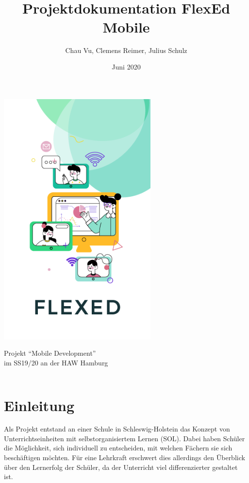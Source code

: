 \documentclass[
  a4paper,
  DIV=10,
  oneside,
  BCOR=5mm,
  parskip=half,
  numbers=noenddot
]{scrreprt}
\title{Projektdokumentation FlexEd Mobile}
\author{Chau Vu, Clemens Reimer, Julius Schulz}
\date{Juni 2020}
\begin{document}

\makeatletter
\begin{titlepage}
   \begin{center}
       \includegraphics[width=0.6\textwidth]{logo}

       \textbf{\@title}

       \vspace{0.5cm}
        Projekt ``Mobile Development'' \\
        im SS19/20 an der HAW Hamburg\\
        
       \vspace{0.8cm}
        \@date\\
        \textbf{\@author}
   \end{center}
\end{titlepage}
\makeatother

\clearpage
\tableofcontents

\clearpage
{}
\chapter{Einleitung}
Als Projekt entstand an einer Schule in Schleswig-Holstein das Konzept von Unterrichtseinheiten mit selbstorganisiertem Lernen (SOL). Dabei haben Schüler die Möglichkeit, sich individuell zu entscheiden, mit welchen Fächern sie sich beschäftigen möchten. Für eine Lehrkraft erschwert dies allerdings den Überblick über den Lernerfolg der Schüler, da der Unterricht viel differenzierter gestaltet ist.
\end{document}

